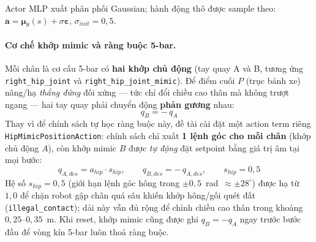 Actor MLP xuất phân phối Gaussian; hành động thô được sample theo:
$\mathbf{a} = \boldsymbol{\mu}_\theta(s) + \sigma\boldsymbol{\varepsilon}$,
$\sigma_{init} = 0{,}5$.

\paragraph{Cơ chế khớp mimic và ràng buộc 5-bar.}
Mỗi chân là cơ cấu 5-bar có \textbf{hai khớp chủ động} (tay quay A và B,
tương ứng \texttt{right\_hip\_joint} và \texttt{right\_hip\_joint\_mimic}).
Để điểm cuối $P$ (trục bánh xe) nâng/hạ \emph{thẳng đứng} đối xứng — tức
chỉ đổi chiều cao thân mà không trượt ngang — hai tay quay phải chuyển động
\textbf{phản gương} nhau:
\begin{equation}
    q_{B} = -\,q_{A}
    \label{eq:mimic_constraint}
\end{equation}
Thay vì để chính sách tự học ràng buộc này, đề tài cài đặt một action term
riêng \texttt{HipMimicPositionAction}: chính sách chỉ xuất \textbf{1 lệnh
góc cho mỗi chân} (khớp chủ động $A$), còn khớp mimic $B$ được \emph{tự
động} đặt setpoint bằng giá trị âm tại mọi bước:
\begin{equation}
    q_{A,des} = a_{hip}\cdot s_{hip},\qquad
    q_{B,des} = -\,q_{A,des},\qquad s_{hip}=0{,}5
    \label{eq:mimic_apply}
\end{equation}
Hệ số $s_{hip}=0{,}5$ (giới hạn lệnh góc hông trong $\pm0{,}5$~rad~$\approx
\pm28^\circ$) được hạ từ $1{,}0$ để chặn robot gập chân quá sâu khiến khớp
hông/gối quét đất (\texttt{illegal\_contact}); dải này vẫn đủ rộng để chỉnh
chiều cao thân trong khoảng $0{,}25$--$0{,}35$~m. Khi reset, khớp mimic cũng
được ghi $q_B = -q_A$ ngay trước bước đầu để vòng kín 5-bar luôn thoả ràng buộc.

